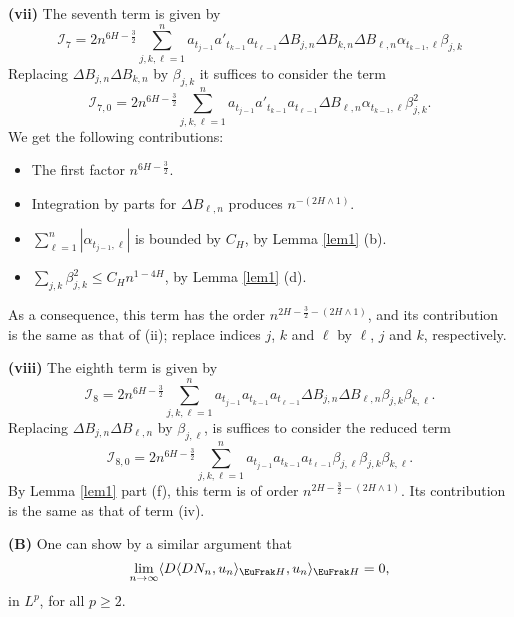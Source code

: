 \documentclass[a4paper]{article}
\newcommand{\colorb}{\color[rgb]{0,0,0.8}}
\newcommand{\colorb}{\color{black}}%
\numberwithin{equation}{section}
\def\HH{\EuFrak H}
\begin{document}
            \medskip
     \noindent
     {\bf (vii)}  The seventh term is given by
          \[
     \mathcal{I}_7=2n^{6H-\frac 32}  \sum_{j,k,\ell=1}^n  a_{t_{j-1}} a'_{t_{k-1}} a_{t_{\ell-1}}  \Delta B_{j,n} \Delta B_{k,n} \Delta B_{\ell,n}  \alpha_{t_{k-1}, \ell} \beta_{j,k}
     \]
     Replacing  $ \Delta B_{j,n} \Delta B_{k,n}$ by $\beta_{j,k}$ it suffices to consider the term
        \[
     \mathcal{I}_{7,0}=2n^{6H-\frac 32}  \sum_{j,k,\ell=1}^n  a_{t_{j-1}} a'_{t_{k-1}} a_{t_{\ell-1}}    \Delta B_{\ell,n}  \alpha_{t_{k-1}, \ell} \beta_{j,k}^2.
     \]  
       We get the following contributions:
        \begin{itemize}
        \item The first factor $n^{6H-\frac 32}$.
        \item Integration by parts for     $\Delta B_{\ell,n}$  produces $n^{-(2H\wedge 1)}$.
        \item  $\sum_{\ell=1}^n|\alpha_{t_{j-1},\ell}|$  is bounded by $C_H $, by  Lemma \ref{lem1} (b).
        \item $\sum_{j,k} \beta_{j,k}^2\le C_H n^{ 1-4H}$,  by  Lemma \ref{lem1} (d).
           \end{itemize}
As a consequence, this term has the order $n^{2H-\frac 32 -(2H\wedge 1)}$, and its contribution is %
{\colorb the same as} 
that of (ii); {\colorb replace indices $j$, $k$ and $\ell$ by $\ell$, $j$ and $k$, respectively.}

 
     
     
    \medskip
     \noindent
     {\bf (viii)}    The eighth term is given by
     \[
     \mathcal{I}_8=    2n^{6H-\frac 32}  \sum_{j,k,\ell=1}^n a_{t_{j-1}} a_{t_{k-1}} a_{t_{\ell-1}} \Delta B _{j,n} \Delta B_{\ell,n} \beta_{j,k} \beta_{k,\ell}.
     \]  
      Replacing $\Delta B _{j,n} \Delta B_{\ell,n} $ by $\beta_{j,\ell}$, is suffices to consider the reduced term
      \[
     \mathcal{I}_{8,0}=    2n^{6H-\frac 32}  \sum_{j,k,\ell=1}^n a_{t_{j-1}} a_{t_{k-1}} a_{t_{\ell-1}}  \beta_{j,\ell} \beta_{j,k} \beta_{k,\ell}.
     \]    
      By Lemma \ref{lem1} part (f), this term is of order $n^{2H-\frac 32 -(2H\wedge 1)}$. Its contribution is  %
      {\colorb the same as} that of term (iv).
      
      \medskip
      \noindent
      {\bf (B)}
   One can show by a similar argument that
      \[
      \lim_{n\rightarrow \infty}  \langle D \langle D N_n, u_n \rangle_{\HH}, u_n \rangle_{\HH} =0,
      \]
      in  $L^p$, for all $p\ge 2$.
      
\end{document}
